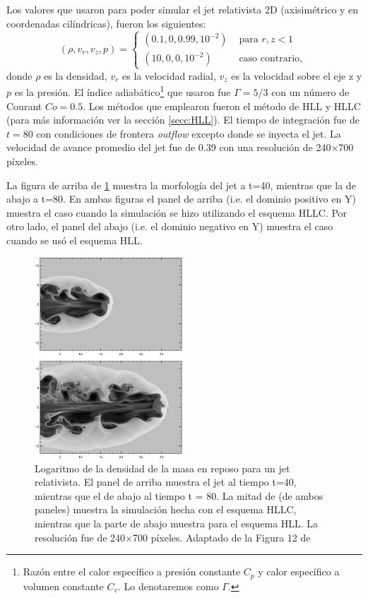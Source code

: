\documentclass[12pt,a4paper]{book}
\begin{document}
Los valores que usaron para poder simular el jet relativista 2D (axisimétrico y en coordenadas cilíndricas), fueron los siguientes:
\begin{equation}
  \left(\rho, v_{r}, v_{z}, p\right)=\left\{\begin{array}{ll}
  \left(0.1,0,0.99,10^{-2}\right) & \text { para } r, z<1 \\
  \left(10,0,0,10^{-2}\right) & \text { caso contrario, }
  \end{array}\right.
\end{equation}
donde $\rho$ es la densidad, $v_r$ es la velocidad radial, $v_z$ es la velocidad sobre el eje z y $p$ es la presión. El índice adiabático\footnote{Razón entre el calor específico
a presión constante $C_p$ y calor específico a volumen constante $C_v$. Lo denotaremos como $\Gamma$.} que usaron fue $\Gamma = 5/3$ con un número de Courant $Co = 0.5$. 
Los métodos que emplearon fueron el método de HLL y HLLC (para más información ver la sección \ref{secc:HLL}). El tiempo de integración fue de $t = 80$ con condiciones de frontera \emph{outflow} excepto donde se 
inyecta el jet. La velocidad de avance promedio  del jet fue de 0.39 con una resolución de 240$\times$700 píxeles. 

La figura de arriba de \ref{fig:jet_mignone} muestra la morfología del jet a t=40, mientras que la de abajo a t=80. En ambas figuras el panel de arriba (i.e. el dominio positivo en Y) muestra el 
caso cuando la simulación se hizo utilizando el esquema HLLC. Por otro lado, el panel del abajo (i.e. el dominio negativo en Y) muestra el caso cuando se usó el esquema HLL.
\begin{figure}
  \begin{center}
    \includegraphics[width=0.5\textwidth]{Figuras/Introduccion/jet_mignone.png}
  \end{center}
  \caption{Logaritmo de la densidad de la masa en reposo para un jet relativista. El panel de arriba muestra el jet al tiempo t=40, mientras que el de abajo al tiempo t = 80.
  La mitad de  (de ambos paneles) muestra la simulación hecha con el esquema HLLC, mientras que la parte de abajo muestra para el esquema HLL.
  La resolución fue de 240$\times$700 píxeles. Adaptado de la Figura 12 de \citet{MB-HLLC-I}}
  \label{fig:jet_mignone}
\end{figure}
\end{document}
